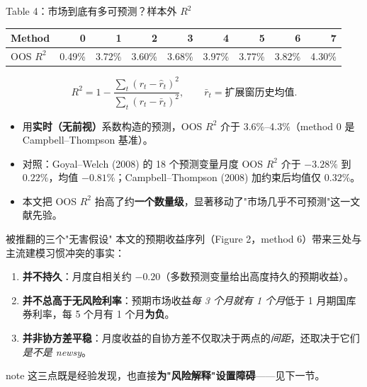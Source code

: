 \documentclass[aspectratio=169,10pt]{beamer}
\newcommand{\tighttable}{\scriptsize\setlength{\tabcolsep}{3pt}\renewcommand{\arraystretch}{1.12}}
\begin{document}
\begin{frame}{Table 4：市场到底有多可预测？样本外 $R^2$}
	\tighttable
	\begin{tabular}{lrrrrrrrr}
		\toprule
		Method & 0 & 1 & 2 & 3 & 4 & 5 & 6 & 7 \\
		\midrule
		OOS $R^2$ & 0.49\% & 3.72\% & 3.60\% & 3.68\% & 3.97\% & 3.77\% & 3.82\% & \alert{4.30\%} \\
		\bottomrule
	\end{tabular}
	\vspace{3pt}
	\[
	R^2=1-\frac{\sum_{t}(r_t-\hat r_t)^2}{\sum_{t}(r_t-\bar r_t)^2},\qquad \bar r_t=\text{扩展窗历史均值}.
	\]
	\begin{itemize}
		\item 用\textbf{实时（无前视）}系数构造的预测，OOS $R^2$ 介于 3.6\%--4.3\%（method 0 是 Campbell--Thompson 基准）。
		\item 对照：Goyal--Welch (2008) 的 18 个预测变量月度 OOS $R^2$ 介于 $-3.28\%$ 到 $0.22\%$，均值 $-0.81\%$；Campbell--Thompson (2008) 加约束后均值仅 $0.32\%$。
		\item 本文把 OOS $R^2$ 抬高了约\textbf{一个数量级}，显著移动了"市场几乎不可预测"这一文献先验。
	\end{itemize}
\end{frame}

\begin{frame}{被推翻的三个"无害假设"}
	本文的预期收益序列（Figure 2，method 6）带来三处与主流建模习惯冲突的事实：
	\begin{enumerate}
		\item \textbf{并不持久}：月度自相关约 $-0.20$（多数预测变量给出高度持久的预期收益）。
		\item \textbf{并不总高于无风险利率}：预期市场收益\emph{每 3 个月就有 1 个月}低于 1 月期国库券利率，每 5 个月有 1 个月\textbf{为负}。
		\item \textbf{并非协方差平稳}：月度收益的自协方差不仅取决于两点的\emph{间距}，还取决于它们\emph{是不是 newsy}。
	\end{enumerate}
	\vspace{3pt}
	\begin{beamercolorbox}[sep=0.45em,wd=\linewidth,rounded=true]{note}
		这三点既是经验发现，也直接\textbf{为"风险解释"设置障碍}——见下一节。
	\end{beamercolorbox}
\end{frame}
\end{document}
